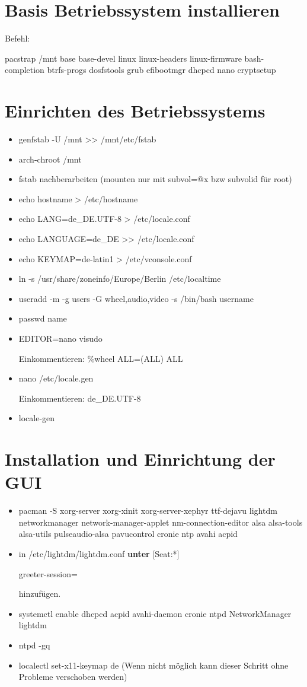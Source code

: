 \documentclass[11pt,a4paper]{article}
\begin{document}
\section{Basis Betriebssystem installieren}
Befehl:

pacstrap /mnt base base-devel linux linux-headers linux-firmware  \textcolor{red}{} bash-completion btrfs-progs dosfstools grub efibootmgr dhcpcd nano cryptsetup
\section{Einrichten des Betriebssystems}
\begin{itemize}
\item genfstab -U /mnt >{}> /mnt/etc/fstab
\item arch-chroot /mnt
\item fstab nachberarbeiten (mounten nur mit subvol=@x bzw subvolid für root)
\item echo hostname > /etc/hostname
\item echo LANG=de\_DE.UTF-8 > /etc/locale.conf
\item echo LANGUAGE=de\_DE >{}> /etc/locale.conf
\item echo KEYMAP=de-latin1 > /etc/vconsole.conf
\item ln -s /usr/share/zoneinfo/Europe/Berlin /etc/localtime
\item useradd -m -g users -G wheel,audio,video -s /bin/bash username
\item passwd \glqq{}name\grqq{}
\item EDITOR=nano visudo

Einkommentieren: \%wheel ALL=(ALL) ALL
\item nano /etc/locale.gen

Einkommentieren: de\_DE.UTF-8
\item locale-gen

\end{itemize}
\section{Installation und Einrichtung der GUI}
\begin{itemize}
\item pacman -S xorg-server xorg-xinit xorg-server-xephyr ttf-dejavu \textcolor{red}{} lightdm \textcolor{red}{}  networkmanager network-manager-applet nm-connection-editor alsa alsa-tools alsa-utils pulseaudio-alsa pavucontrol cronie ntp avahi acpid
\item in \glqq{}/etc/lightdm/lightdm.conf\grqq{} \textbf{unter} [Seat:*] 

greeter-session=\textcolor{red}{} 

hinzufügen.
\item systemctl enable dhcpcd acpid avahi-daemon cronie ntpd NetworkManager lightdm
\item ntpd -gq
\item localectl set-x11-keymap de (Wenn nicht möglich kann dieser Schritt ohne Probleme verschoben werden)
\end{itemize}
\end{document}
